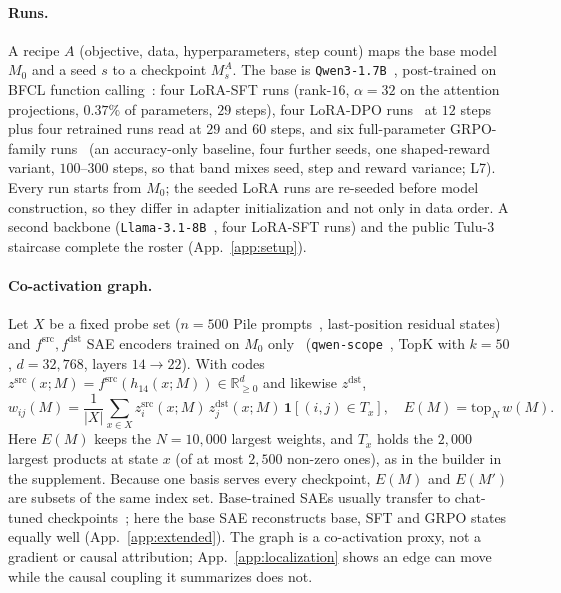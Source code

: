 \documentclass{article}
\begin{document}
\paragraph{Runs.} A recipe $A$ (objective, data, hyperparameters, step count) maps the base model $M_0$ and a seed $s$ to a checkpoint $M^A_s$. The base is \texttt{Qwen3-1.7B}~\citep{yang2025qwen3}, post-trained on BFCL function calling~\citep{patil2024bfcl}: four LoRA-SFT runs (rank-$16$, $\alpha{=}32$ on the attention projections, $0.37\%$ of parameters, $29$ steps), four LoRA-DPO runs~\citep{rafailov2023dpo} at $12$ steps plus four retrained runs read at $29$ and $60$ steps, and six full-parameter GRPO-family runs~\citep{shao2024deepseekmath} (an accuracy-only baseline, four further seeds, one shaped-reward variant, $100$--$300$ steps, so that band mixes seed, step and reward variance; L7). Every run starts from $M_0$; the seeded LoRA runs are re-seeded before model construction, so they differ in adapter initialization and not only in data order. A second backbone (\texttt{Llama-3.1-8B}~\citep{grattafiori2024llama3}, four LoRA-SFT runs) and the public Tulu-3 staircase complete the roster (App.~\ref{app:setup}).

\paragraph{Co-activation graph.} Let $X$ be a fixed probe set ($n{=}500$ Pile prompts~\citep{gao2020pile}, last-position residual states) and $f^{\mathrm{src}},f^{\mathrm{dst}}$ SAE encoders trained on $M_0$ only~\citep{bricken2023monosemanticity,templeton2024scaling,gao2024scaling} (\texttt{qwen-scope}~\citep{deng2026qwenscope}, TopK with $k{=}50$, $d{=}32{,}768$, layers $14\to22$). With codes $z^{\mathrm{src}}(x;M)=f^{\mathrm{src}}(h_{14}(x;M))\in\mathbb{R}^{d}_{\ge0}$ and likewise $z^{\mathrm{dst}}$,
\begin{equation}
w_{ij}(M)=\frac{1}{|X|}\sum_{x\in X} z^{\mathrm{src}}_i(x;M)\,z^{\mathrm{dst}}_j(x;M)\,\mathbf{1}[(i,j)\in T_x],\quad E(M)=\mathrm{top}_N\,w(M).
\label{eq:graph}
\end{equation}
Here $E(M)$ keeps the $N=10{,}000$ largest weights, and $T_x$ holds the $2{,}000$ largest products at state $x$ (of at most $2{,}500$ non-zero ones), as in the builder in the supplement. Because one basis serves every checkpoint, $E(M)$ and $E(M')$ are subsets of the same index set. Base-trained SAEs usually transfer to chat-tuned checkpoints~\citep{kissane2024saes}; here the base SAE reconstructs base, SFT and GRPO states equally well (App.~\ref{app:extended}). The graph is a co-activation proxy, not a gradient or causal attribution; App.~\ref{app:localization} shows an edge can move while the causal coupling it summarizes does not.
\end{document}
